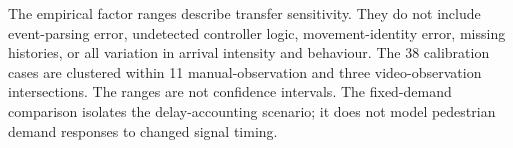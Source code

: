 \documentclass[11pt]{article}
\begin{document}
The empirical factor ranges describe transfer sensitivity. They do not include event-parsing error, undetected controller logic, movement-identity error, missing histories, or all variation in arrival intensity and behaviour. The 38 calibration cases are clustered within 11 manual-observation and three video-observation intersections. The ranges are not confidence intervals. The fixed-demand comparison isolates the delay-accounting scenario; it does not model pedestrian demand responses to changed signal timing.



\end{document}
